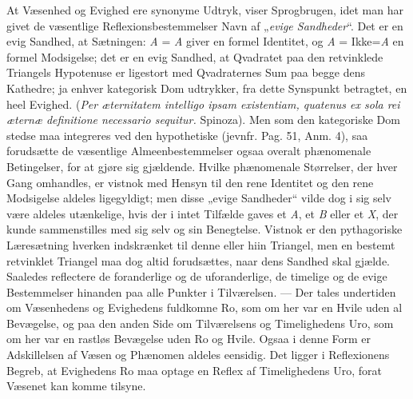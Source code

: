 \documentclass[12pt]{book}
\newcommand{\opage}[1]{\marginnote{\footnotesize\textit{[#1]}}}
\begin{document}
At Væsenhed og Evighed ere synonyme Udtryk, viser Sprogbrugen, idet man har givet de
væsentlige Reflexionsbestemmelser Navn af „\emph{evige Sandheder}“. Det er en evig
Sandhed, at Sætningen: \textit{A} = \textit{A} giver en formel Identitet, og
\textit{A} = Ikke=\textit{A} en formel Modsigelse; det er en evig Sandhed, at
Qvadratet paa den retvinklede Triangels Hypotenuse er ligestort med Qvadraternes Sum
paa begge dens Kathedre; ja enhver kategorisk Dom udtrykker, fra dette Synspunkt
betragtet, en heel Evighed. (\textit{Per æternitatem intelligo ipsam existentiam,
quatenus ex sola rei æternæ definitione necessario sequitur.} Spinoza). Men som den
kategoriske Dom stedse maa integreres ved den hypothetiske (jevnfr. Pag. 51, Anm. 4),
saa forudsætte de væsentlige Almeenbestemmelser ogsaa overalt phænomenale
Betingelser, for at gjøre sig gjældende. Hvilke phænomenale Størrelser, der hver Gang
omhandles, er vistnok med Hensyn til den rene Identitet og den rene Modsigelse
aldeles ligegyldigt; men disse „evige Sandheder“ vilde dog i sig selv være aldeles
utænkelige, hvis der i intet Tilfælde gaves et \textit{A}, et \textit{B} eller et
\textit{X}, der kunde sammenstilles med sig selv og sin Benegtelse. Vistnok er den
pythagoriske Læresætning hverken indskrænket til denne eller
\opage{125} %
hiin Triangel, men en bestemt retvinklet Triangel maa dog altid forudsættes, naar
dens Sandhed skal gjælde. Saaledes reflectere de foranderlige og de uforanderlige, de
timelige og de evige Bestemmelser hinanden paa alle Punkter i Tilværelsen. --- Der
tales undertiden om Væsenhedens og Evighedens fuldkomne Ro, som om her var en Hvile
uden al Bevægelse, og paa den anden Side om Tilværelsens og Timelighedens Uro, som om
her var en rastløs Bevægelse uden Ro og Hvile. Ogsaa i denne Form er Adskillelsen af
Væsen og Phænomen aldeles eensidig. Det ligger i Reflexionens Begreb, at Evighedens
Ro maa optage en Reflex af Timelighedens Uro, forat Væsenet kan komme tilsyne.
\end{document}
